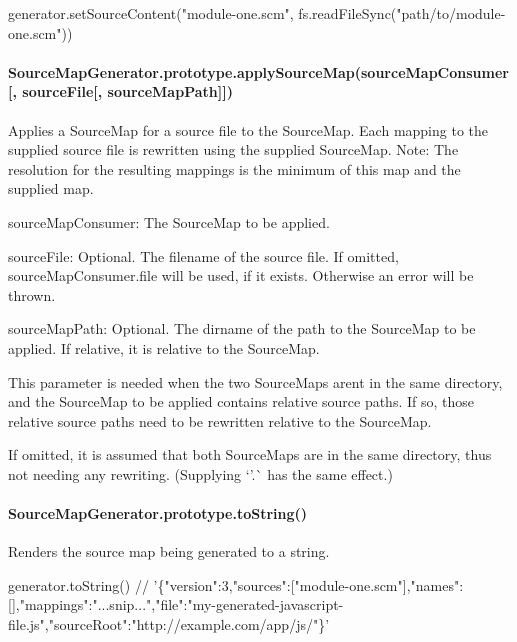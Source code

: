 \begin{DoxyCode}
generator.setSourceContent("module-one.scm",
                           fs.readFileSync("path/to/module-one.scm"))
\end{DoxyCode}


\paragraph*{Source\+Map\+Generator.\+prototype.\+apply\+Source\+Map(source\+Map\+Consumer\mbox{[}, source\+File\mbox{[}, source\+Map\+Path\mbox{]}\mbox{]})}

Applies a Source\+Map for a source file to the Source\+Map. Each mapping to the supplied source file is rewritten using the supplied Source\+Map. Note\+: The resolution for the resulting mappings is the minimum of this map and the supplied map.


\begin{DoxyItemize}
\item {\ttfamily source\+Map\+Consumer}\+: The Source\+Map to be applied.
\item {\ttfamily source\+File}\+: Optional. The filename of the source file. If omitted, source\+Map\+Consumer.\+file will be used, if it exists. Otherwise an error will be thrown.
\item {\ttfamily source\+Map\+Path}\+: Optional. The dirname of the path to the Source\+Map to be applied. If relative, it is relative to the Source\+Map.

This parameter is needed when the two Source\+Maps aren\textquotesingle{}t in the same directory, and the Source\+Map to be applied contains relative source paths. If so, those relative source paths need to be rewritten relative to the Source\+Map.

If omitted, it is assumed that both Source\+Maps are in the same directory, thus not needing any rewriting. (Supplying `'.\textquotesingle{}\`{} has the same effect.)
\end{DoxyItemize}

\paragraph*{Source\+Map\+Generator.\+prototype.\+to\+String()}

Renders the source map being generated to a string.


\begin{DoxyCode}
generator.toString()
//
       '\{"version":3,"sources":["module-one.scm"],"names":[],"mappings":"...snip...","file":"my-generated-javascript-file.js","sourceRoot":"http://example.com/app/js/"\}'
\end{DoxyCode}


